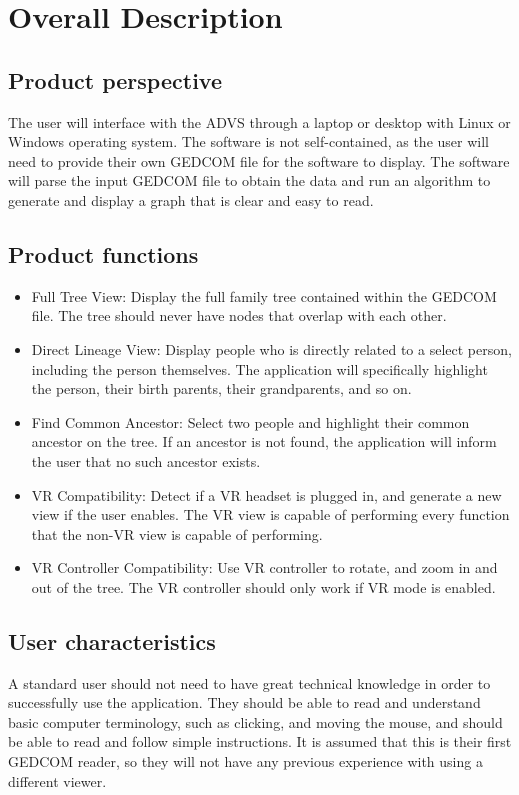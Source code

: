 \documentclass[onecolumn, draftclsnofoot, 10pt, compsoc]{IEEEtran}
\begin{document}
\section{Overall Description}
\subsection{Product perspective}
\begin{singlespace}
	The user will interface with the ADVS through a laptop or desktop with Linux or Windows operating system. The software is not self-contained, as the user will need to provide their own GEDCOM file for the software to display. The software will parse the input GEDCOM file to obtain the data and run an algorithm to generate and display a graph that is clear and easy to read.
\end{singlespace}

\subsection{Product functions}
\begin{itemize}
\item Full Tree View: Display the full family tree contained within the GEDCOM file. The tree should never have nodes that overlap with each other.
\item Direct Lineage View: Display people who is directly related to a select person, including the person themselves. The application will specifically highlight the person, their birth parents, their grandparents, and so on.
\item Find Common Ancestor: Select two people and highlight their common ancestor on the tree. If an ancestor is not found, the application will inform the user that no such ancestor exists.
\item VR Compatibility: Detect if a VR headset is plugged in, and generate a new view if the user enables. The VR view is capable of performing every function that the non-VR view is capable of performing.
\item VR Controller Compatibility: Use VR controller to rotate, and zoom in and out of the tree. The VR controller should only work if VR mode is enabled.

\end{itemize}

\subsection{User characteristics}
\begin{singlespace}
	A standard user should not need to have great technical knowledge in order to successfully use the application. They should be able to read and understand basic computer terminology, such as clicking, and moving the mouse, and should be able to read and follow simple instructions. It is assumed that this is their first GEDCOM reader, so they will not have any previous experience with using a different viewer.
\end{singlespace}
\end{document}
